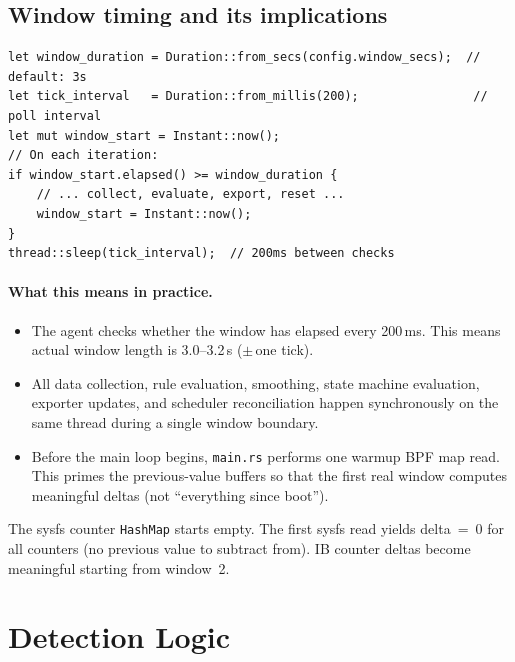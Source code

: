 \documentclass[11pt]{article}
\begin{document}
\subsection{Window timing and its implications}

\begin{lstlisting}[caption={Window timing from main.rs}]
let window_duration = Duration::from_secs(config.window_secs);  // default: 3s
let tick_interval   = Duration::from_millis(200);                // poll interval
let mut window_start = Instant::now();
// On each iteration:
if window_start.elapsed() >= window_duration {
    // ... collect, evaluate, export, reset ...
    window_start = Instant::now();
}
thread::sleep(tick_interval);  // 200ms between checks
\end{lstlisting}

\paragraph{What this means in practice.}
\begin{itemize}[nosep]
  \item The agent checks whether the window has elapsed every 200\,ms. This
        means actual window length is 3.0--3.2\,s ($\pm$\,one tick).
  \item All data collection, rule evaluation, smoothing, state machine
        evaluation, exporter updates, and scheduler reconciliation happen
        synchronously on the same thread during a single window boundary.
  \item Before the main loop begins, \texttt{main.rs} performs one warmup
        BPF map read. This primes the previous-value buffers so that the
        first real window computes meaningful deltas (not ``everything since
        boot'').
\end{itemize}

\begin{warningbox}
  The sysfs counter \texttt{HashMap} starts empty. The first sysfs read
  yields delta~=~0 for all counters (no previous value to subtract from).
  IB counter deltas become meaningful starting from window~2.
\end{warningbox}


\section{Detection Logic}
\label{sec:detection}
\end{document}
